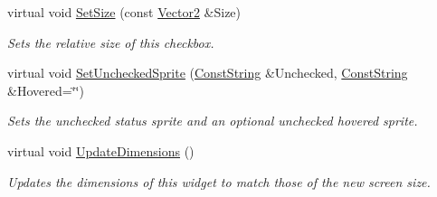 \begin{DoxyCompactItemize}
virtual void \hyperlink{classMezzanine_1_1UI_1_1CheckBox_a4fb7dc586245da0cdcfc789f8a1c83a3}{SetSize} (const \hyperlink{classMezzanine_1_1Vector2}{Vector2} \&Size)
\begin{DoxyCompactList}\small\item\em Sets the relative size of this checkbox. \item\end{DoxyCompactList}\item 
virtual void \hyperlink{classMezzanine_1_1UI_1_1CheckBox_a48a0deb7a6bbb25185396fe63c864ac5}{SetUncheckedSprite} (\hyperlink{namespaceMezzanine_a63cd699ac54b73953f35ec9cfc05e506}{ConstString} \&Unchecked, \hyperlink{namespaceMezzanine_a63cd699ac54b73953f35ec9cfc05e506}{ConstString} \&Hovered=\char`\"{}\char`\"{})
\begin{DoxyCompactList}\small\item\em Sets the unchecked status sprite and an optional unchecked hovered sprite. \item\end{DoxyCompactList}\item 
virtual void \hyperlink{classMezzanine_1_1UI_1_1CheckBox_ac7754437c455f40aaf6d4bca4cb0c7a9}{UpdateDimensions} ()
\begin{DoxyCompactList}\small\item\em Updates the dimensions of this widget to match those of the new screen size. \item\end{DoxyCompactList}\end{DoxyCompactItemize}
